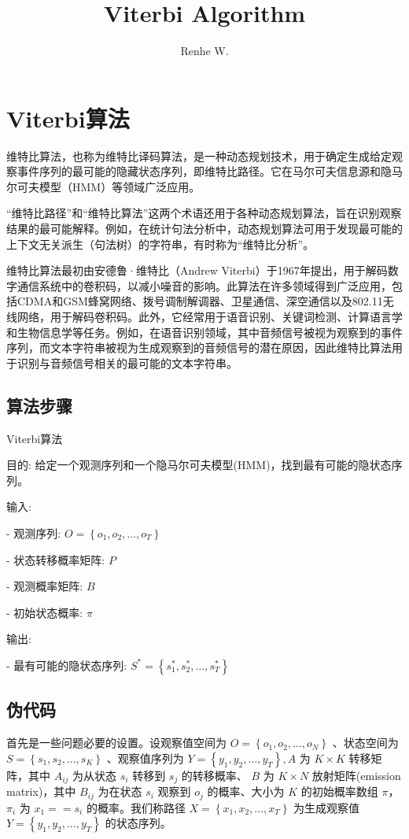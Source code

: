 \documentclass[UTF8,12pt]{ctexart}
\title{Viterbi Algorithm}
\author{Renhe W.}
\date{ }
\numberwithin{equation}{section}%
\begin{document}
	
	\maketitle
	\tableofcontents%
	\listoffigures%
	\listoftables%
	\newpage
	\kaishu
	
	
	\section{Viterbi算法}
	维特比算法，也称为维特比译码算法，是一种动态规划技术，用于确定生成给定观察事件序列的最可能的隐藏状态序列，即维特比路径。它在马尔可夫信息源和隐马尔可夫模型（HMM）等领域广泛应用。
	
	“维特比路径”和“维特比算法”这两个术语还用于各种动态规划算法，旨在识别观察结果的最可能解释。例如，在统计句法分析中，动态规划算法可用于发现最可能的上下文无关派生（句法树）的字符串，有时称为“维特比分析”。
	
	维特比算法最初由安德鲁·维特比（Andrew Viterbi）于1967年提出，用于解码数字通信系统中的卷积码，以减小噪音的影响。此算法在许多领域得到广泛应用，包括CDMA和GSM蜂窝网络、拨号调制解调器、卫星通信、深空通信以及802.11无线网络，用于解码卷积码。此外，它经常用于语音识别、关键词检测、计算语言学和生物信息学等任务。例如，在语音识别领域，其中音频信号被视为观察到的事件序列，而文本字符串被视为生成观察到的音频信号的潜在原因，因此维特比算法用于识别与音频信号相关的最可能的文本字符串。
	\subsection{算法步骤}
	Viterbi算法
	
	目的: 给定一个观测序列和一个隐马尔可夫模型(HMM)，找到最有可能的隐状态序列。
	
	输入:
	
	- 观测序列: $O=\left\{o_1, o_2, \ldots,
	 o_T\right\}$
	 
	- 状态转移概率矩阵: $P$
	
	- 观测概率矩阵: $B$
	
	- 初始状态概率: $\pi$
	
	输出:
	
	- 最有可能的隐状态序列: $S^*=\left\{s_1^*, s_2^*, \ldots, s_T^*\right\}$
	
	\subsection{伪代码}
	首先是一些问题必要的设置。设观察值空间为 $O=\left\{o_1, o_2, \ldots, o_N\right\}$ 、状态空间为 $S=\left\{s_1, s_2, \ldots, s_K\right\}$ 、观察值序列为 $Y=\left\{y_1, y_2, \ldots, y_T\right\}, A$ 为 $K \times K$ 转移矩阵，其中 $A_{i j}$ 为从状态 $s_i$ 转移到 $s_j$ 的转移概率、 $B$ 为 $K \times N$ 放射矩阵(emission matrix)，其中 $B_{i j}$ 为在状态 $s_i$ 观察到 $o_j$ 的概率、大小为 $K$ 的初始概率数组 $\pi $， $\pi_i$ 为 $x_1==s_i$ 的概率。我们称路径 $X=\left\{x_1, x_2, \ldots, x_T\right\}$ 为生成观察值 $Y=\left\{y_1, y_2, \ldots, y_T\right\}$ 的状态序列。
	
\end{document}
